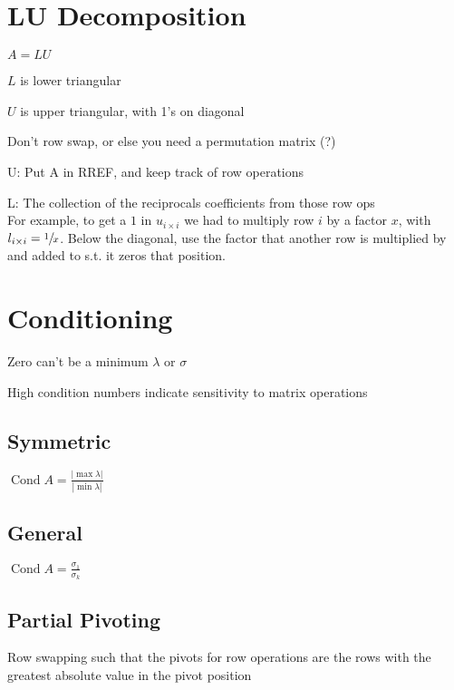 \documentclass[10pt,letterpaper]{article}
\newenvironment{tight_item}
{\begin{itemize}
\setlength{\parskip}{0pt}
\setlength{\parsep}{0pt}
\setlength{\itemsep}{0pt}
\setlength{\parsep}{0pt}
\setlength{\topsep}{0pt}
\setlength{\partopsep}{0pt}
\setlength{\leftmargin}{0em}
\setlength{\labelwidth}{0em}
\setlength{\labelsep}{0em} }
{\end{itemize}}
\newenvironment{tight_enum}
{\begin{enumerate}
\setlength{\parskip}{0pt}
\setlength{\parsep}{0pt}
\setlength{\itemsep}{0pt}
\setlength{\parsep}{0pt}
\setlength{\topsep}{0pt}
\setlength{\partopsep}{0pt}
\setlength{\leftmargin}{0em}
\setlength{\labelwidth}{0em}
\setlength{\labelsep}{0em} }
{\end{enumerate}}
\begin{document}
{\begin{multicols*}{5}
\section{LU Decomposition}
\begin{center}
$A = LU$
\end{center}
\begin{tight_item}
\item $L$ is lower triangular
\item $U$ is upper triangular, with 1's on diagonal
\item Don't row swap, or else you need a permutation matrix (?)
\end{tight_item}
\begin{tight_enum}
\item U: Put A in RREF, and keep track of row operations
\item L: The collection of the reciprocals coefficients from those row ops \\
For example, to get a $1$ in $u_{i \times i}$ we had to multiply row $i$ by a factor $x$, with $l_{i \times i} = \sfrac{1}{x}$. Below the diagonal, use the factor that another row is multiplied by and added to s.t. it zeros that position. 
\end{tight_enum}

\section{Conditioning}
\begin{tight_item}
\item Zero can't be a minimum $\lambda$ or $\sigma$
\item High condition numbers indicate sensitivity to matrix operations
\end{tight_item}
\subsection{Symmetric}
\begin{center}
$\operatorname{Cond}A = \frac{| \max{\lambda} |}{| \min{\lambda} |}$
\end{center}
\subsection{General}
\begin{center}
$\operatorname{Cond}A = \frac{\sigma_{1}}{\sigma_{k}}$
\end{center}
\subsection{Partial Pivoting}
\begin{tight_item}
\item Row swapping such that the pivots for row operations are the rows with the
greatest absolute value in the pivot position
\end{tight_item}

\end{multicols*}
}
\end{document}
